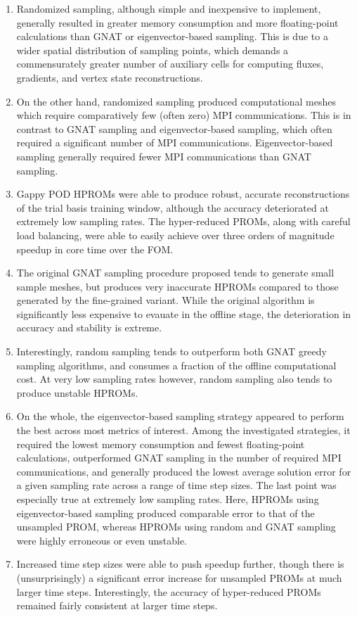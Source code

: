 \begin{enumerate}
    \item Randomized sampling, although simple and inexpensive to implement, generally resulted in greater memory consumption and more floating-point calculations than GNAT or eigenvector-based sampling. This is due to a wider spatial distribution of sampling points, which demands a commensurately greater number of auxiliary cells for computing fluxes, gradients, and vertex state reconstructions.
    \item On the other hand, randomized sampling produced computational meshes which require comparatively few (often zero) MPI communications. This is in contrast to GNAT sampling and eigenvector-based sampling, which often required a significant number of MPI communications. Eigenvector-based sampling generally required fewer MPI communications than GNAT sampling.
    \item Gappy POD HPROMs were able to produce robust, accurate reconstructions of the trial basis training window, although the accuracy deteriorated at extremely low sampling rates. The hyper-reduced PROMs, along with careful load balancing, were able to easily achieve over three orders of magnitude speedup in core time over the FOM.
    \item The original GNAT sampling procedure proposed tends to generate small sample meshes, but produces very inaccurate HPROMs compared to those generated by the fine-grained variant. While the original algorithm is significantly less expensive to evauate in the offline stage, the deterioration in accuracy and stability is extreme.
    \item Interestingly, random sampling tends to outperform both GNAT greedy sampling algorithms, and consumes a fraction of the offline computational cost. At very low sampling rates however, random sampling also tends to produce unstable HPROMs.
    \item On the whole, the eigenvector-based sampling strategy appeared to perform the best across most metrics of interest. Among the investigated strategies, it required the lowest memory consumption and fewest floating-point calculations, outperformed GNAT sampling in the number of required MPI communications, and generally produced the lowest average solution error for a given sampling rate across a range of time step sizes. The last point was especially true at extremely low sampling rates. Here, HPROMs using eigenvector-based sampling produced comparable error to that of the unsampled PROM, whereas HPROMs using random and GNAT sampling were highly erroneous or even unstable.
    \item Increased time step sizes were able to push speedup further, though there is (unsurprisingly) a significant error increase for unsampled PROMs at much larger time steps. Interestingly, the accuracy of hyper-reduced PROMs remained fairly consistent at larger time steps.
\end{enumerate}